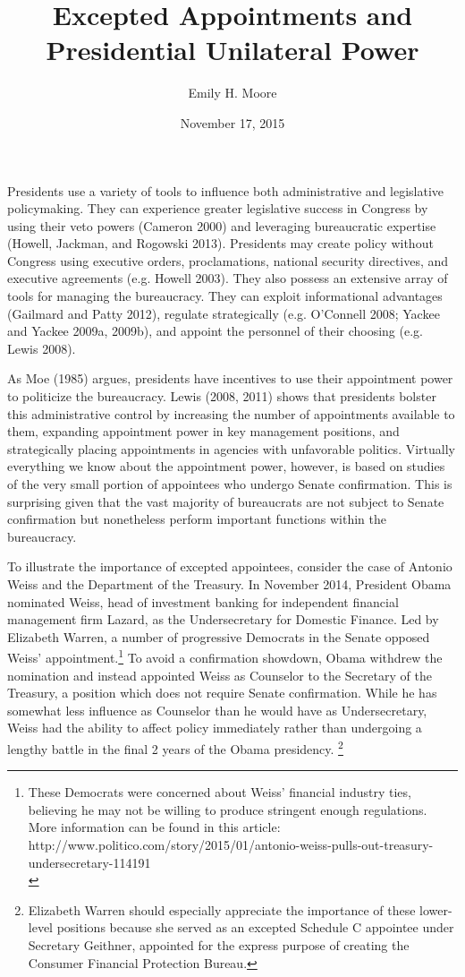\documentclass[12pt]{article}
\title{Excepted Appointments and Presidential Unilateral Power}
\date{November 17, 2015}
\author{Emily H. Moore}
\begin{document}

\maketitle
\parindent=0.5in
\parskip=0.01in
\doublespacing

Presidents use a variety of tools to influence both administrative and legislative policymaking. They can experience greater legislative success in Congress by using their veto powers (Cameron 2000) and leveraging bureaucratic expertise (Howell, Jackman, and Rogowski 2013). Presidents may create policy without Congress using executive orders, proclamations, national security directives, and executive agreements (e.g. Howell 2003). They  also possess an extensive array of tools for managing the bureaucracy. They can exploit informational advantages (Gailmard and Patty 2012), regulate strategically (e.g. O'Connell 2008; Yackee and Yackee 2009a, 2009b), and appoint the personnel of their choosing (e.g. Lewis 2008). 

	As Moe (1985) argues, presidents have incentives to use their appointment power to politicize the bureaucracy. Lewis (2008, 2011) shows that presidents bolster this administrative control by increasing the number of appointments available to them, expanding appointment power in key management positions, and strategically placing appointments in agencies with unfavorable politics. Virtually everything we know about the appointment power, however, is based on studies of the very small portion of appointees who undergo Senate confirmation. This is surprising given that the vast majority of bureaucrats are not subject to Senate confirmation but nonetheless perform important functions within the bureaucracy.
	
	To illustrate the importance of excepted appointees, consider the case of Antonio Weiss and the Department of the Treasury. In November 2014, President Obama nominated Weiss, head of investment banking for independent financial management firm Lazard, as the Undersecretary for Domestic Finance. Led by Elizabeth Warren, a number of progressive Democrats in the Senate opposed Weiss' appointment.\footnote{ These Democrats were concerned about Weiss' financial industry ties, believing he may not be willing to produce stringent enough regulations. More information can be found in this article: http://www.politico.com/story/2015/01/antonio-weiss-pulls-out-treasury-undersecretary-114191\\} To avoid a confirmation showdown, Obama withdrew the nomination and instead appointed Weiss as Counselor to the Secretary of the Treasury, a position which does not require Senate confirmation. While he has somewhat less influence as Counselor than he would have as Undersecretary, Weiss had the ability to affect policy immediately rather than undergoing a lengthy battle in the final 2 years of the Obama presidency.	\footnote{ Elizabeth Warren should especially appreciate the importance of these lower-level positions because she served as an excepted Schedule C appointee under Secretary Geithner, appointed for the express purpose of creating the Consumer Financial Protection Bureau.}
	
\end{document}

